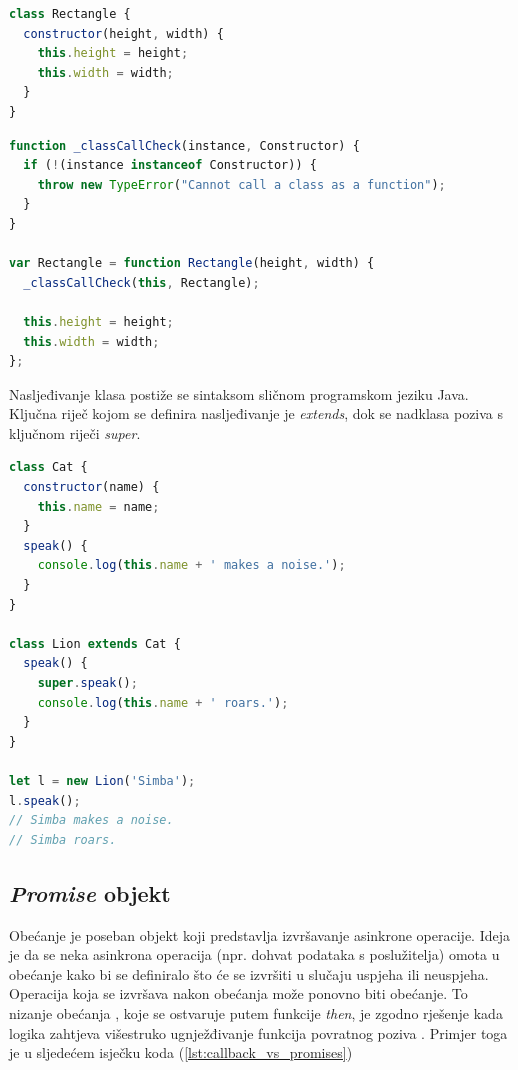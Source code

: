 \documentclass[times, utf8, zavrsni, numeric]{fer}
\newcommand{\razmakp}{\vspace{18pt}}
\newcommand{\razmaks}{\vspace{10pt}}
\begin{document}
\razmakp
\begin{lstlisting}[language=JavaScript, caption={Primjer klase}, label={lst:class_example}]
class Rectangle {
  constructor(height, width) {
    this.height = height;
    this.width = width;
  }
}
\end{lstlisting}
\razmaks

\razmakp
\begin{lstlisting}[language=JavaScript, caption={Isječak koda \ref{lst:class_example} preveden u stari standard}, label={lst:class_example_old_js}]
function _classCallCheck(instance, Constructor) {
  if (!(instance instanceof Constructor)) {
    throw new TypeError("Cannot call a class as a function");
  }
}

var Rectangle = function Rectangle(height, width) {
  _classCallCheck(this, Rectangle);

  this.height = height;
  this.width = width;
};
\end{lstlisting}
\razmaks

Nasljeđivanje klasa postiže se sintaksom sličnom programskom jeziku Java.
Ključna riječ kojom se definira nasljeđivanje je \emph{extends}, dok se nadklasa poziva s ključnom riječi \emph{super}.

\razmakp
\begin{lstlisting}[language=JavaScript, caption={Primjer naljeđivanja}]
class Cat { 
  constructor(name) {
    this.name = name;
  }
  speak() {
    console.log(this.name + ' makes a noise.');
  }
}

class Lion extends Cat {
  speak() {
    super.speak();
    console.log(this.name + ' roars.');
  }
}

let l = new Lion('Simba');
l.speak(); 
// Simba makes a noise.
// Simba roars.
\end{lstlisting}
\razmaks


\subsection{\emph{Promise} objekt} \label{sec:promise}

Obećanje  je poseban objekt koji predstavlja izvršavanje asinkrone operacije.
Ideja je da se neka asinkrona operacija (npr. dohvat podataka s poslužitelja) omota u obećanje kako bi se definiralo što će se izvršiti u slučaju uspjeha ili neuspjeha.
Operacija koja se izvršava nakon obećanja može ponovno biti obećanje.
To nizanje obećanja , koje se ostvaruje putem funkcije \emph{then}, je zgodno rješenje kada logika zahtjeva višestruko ugnježđivanje funkcija povratnog poziva \citep{MDNUsingPromises}.
Primjer toga je u sljedećem isječku koda (\ref{lst:callback_vs_promises})
\end{document}
